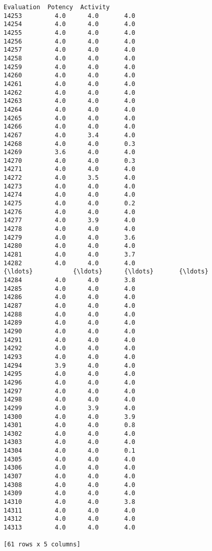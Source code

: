 \documentclass[11pt]{article}
\begin{document}
\begin{Verbatim}[commandchars=\\\{\}]
       Evaluation  Potency  Activity  
14253         4.0      4.0       4.0  
14254         4.0      4.0       4.0  
14255         4.0      4.0       4.0  
14256         4.0      4.0       4.0  
14257         4.0      4.0       4.0  
14258         4.0      4.0       4.0  
14259         4.0      4.0       4.0  
14260         4.0      4.0       4.0  
14261         4.0      4.0       4.0  
14262         4.0      4.0       4.0  
14263         4.0      4.0       4.0  
14264         4.0      4.0       4.0  
14265         4.0      4.0       4.0  
14266         4.0      4.0       4.0  
14267         4.0      3.4       4.0  
14268         4.0      4.0       0.3  
14269         3.6      4.0       4.0  
14270         4.0      4.0       0.3  
14271         4.0      4.0       4.0  
14272         4.0      3.5       4.0  
14273         4.0      4.0       4.0  
14274         4.0      4.0       4.0  
14275         4.0      4.0       0.2  
14276         4.0      4.0       4.0  
14277         4.0      3.9       4.0  
14278         4.0      4.0       4.0  
14279         4.0      4.0       3.6  
14280         4.0      4.0       4.0  
14281         4.0      4.0       3.7  
14282         4.0      4.0       4.0  
{\ldots}           {\ldots}      {\ldots}       {\ldots}  
14284         4.0      4.0       3.8  
14285         4.0      4.0       4.0  
14286         4.0      4.0       4.0  
14287         4.0      4.0       4.0  
14288         4.0      4.0       4.0  
14289         4.0      4.0       4.0  
14290         4.0      4.0       4.0  
14291         4.0      4.0       4.0  
14292         4.0      4.0       4.0  
14293         4.0      4.0       4.0  
14294         3.9      4.0       4.0  
14295         4.0      4.0       4.0  
14296         4.0      4.0       4.0  
14297         4.0      4.0       4.0  
14298         4.0      4.0       4.0  
14299         4.0      3.9       4.0  
14300         4.0      4.0       3.9  
14301         4.0      4.0       0.8  
14302         4.0      4.0       4.0  
14303         4.0      4.0       4.0  
14304         4.0      4.0       0.1  
14305         4.0      4.0       4.0  
14306         4.0      4.0       4.0  
14307         4.0      4.0       4.0  
14308         4.0      4.0       4.0  
14309         4.0      4.0       4.0  
14310         4.0      4.0       3.8  
14311         4.0      4.0       4.0  
14312         4.0      4.0       4.0  
14313         4.0      4.0       4.0  

[61 rows x 5 columns]

    \end{Verbatim}
\end{document}
